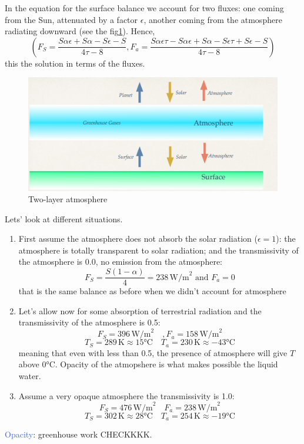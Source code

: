 In the equation for the surface balance we account for two fluxes: one coming from the Sun, attenuated by a factor $\epsilon$, another coming from the atmosphere radiating downward (see the fig\ref{fig:two layer}).
Hence,
\begin{equation}
	\left(F_S=\frac{S\alpha\epsilon+S\alpha-S\epsilon-S}{4\tau-8}, F_a=\frac{S\alpha\epsilon\tau-S\alpha\epsilon+S\alpha-S\epsilon\tau+S\epsilon-S}{4\tau-8}\right)
\end{equation}
this the solution in terms of the fluxes.
\begin{figure}[h!]
	\centering
	\includegraphics[width=0.5\linewidth]{uploads/Screenshot 2024-11-20 114831.png}
	\caption{Two-layer atmosphere}
	\label{fig:two layer}
\end{figure}
Lets’ look at different situations.
\begin{enumerate}
	\item First assume the atmosphere does not absorb the solar radiation ($\epsilon = 1$): the atmosphere is totally transparent to solar radiation; and the transmissivity of the atmosphere is 0.0, no emission from the atmosphere:
	      $$F_S=\frac{S(1-\alpha)}{4}=238 \,\text{W/m}^2 \,\,\text{and}\,\, F_a=0$$
	      that is the same balance as before when we didn't account for atmosphere
	\item Let’s allow now for some absorption of terrestrial radiation and the transmissivity of the atmosphere is 0.5:
	      $$F_S= 396 \,\text{W/m}^2 \quad, F_a=158 \, \text{W/m}^2$$
	      $$T_S= 289 \,\text{K}\approx 15°\text{C} \quad T_a=230 \, \text{K}\approx -43°\text{C}$$
	      meaning that even with less than 0.5, the presence of atmosphere will give $T$ above 0°C. Opacity of the atmopshere is what makes possible the liquid water.
	\item Assume a very opaque atmosphere the transmissivity is 1.0:
	      $$F_S=476 \,\text{W/m}^2 \quad F_a=238 \, \text{W/m}^2$$
	      $$T_S= 302 \,\text{K}\approx 28°\text{C} \quad T_a=254 \, \text{K}\approx -19°\text{C}$$
\end{enumerate}
\textcolor{RoyalBlue}{Opacity}: greenhouse work CHECKKKK.
